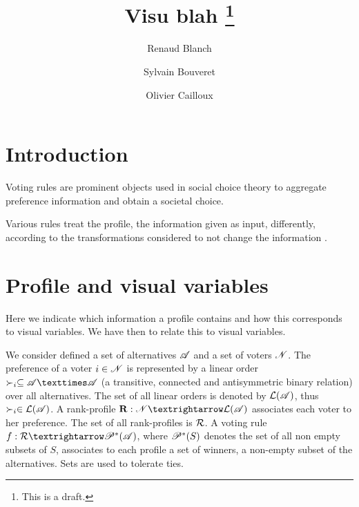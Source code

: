 \documentclass[version=last, pagesize, twoside=off, bibliography=totoc, DIV=calc, fontsize=12pt, a4paper, french, english]{scrartcl}
\begin{document}
\title{%
	\texorpdfstring{
		Visu blah%
		\thanks{
			This is a draft.
		}
	}{%
		Visu
	}
}
\author{Renaud Blanch}
\author{Sylvain Bouveret}
\author{Olivier Cailloux}
\maketitle

\section{Introduction}
\label{sec:intro}
Voting rules are prominent objects used in social choice theory to aggregate preference information and obtain a societal choice.

Various rules treat the profile, the information given as input, differently, according to the transformations considered to not change the information \citep{sen_social_1986, sen_informational_1974, sen_weights_1977, blackorby_social_1984}.

\section{Profile and visual variables}
Here we indicate which information a profile contains and how this corresponds to visual variables.
We have then to relate this to visual variables.

We consider defined a set of alternatives $\mathscr{A}$ and a set of voters $\mathscr{N}$. The preference of a voter $i \in \mathscr{N}$ is represented by a linear order $\pref_i \subseteq \allalts × \allalts$ (a transitive, connected and antisymmetric binary relation) over all alternatives. The set of all linear orders is denoted by $\mathcal{L}(\mathscr{A})$, thus $\succ_i \in \mathcal{L}(\mathscr{A})$. A rank-profile $\prof: \allvoters → \linors$ associates each voter to her preference. The set of all rank-profiles is $\mathcal{R}$. A voting rule $f: \allprofs → \powersetz{\allalts}$, where $\mathscr{P}^*(S)$ denotes the set of all non empty subsets of $S$, associates to each profile a set of winners, a non-empty subset of the alternatives. Sets are used to tolerate ties.
\end{document}
